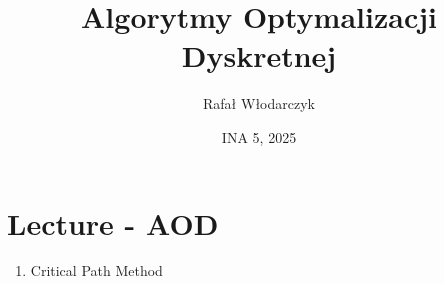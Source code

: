 \documentclass{article}
\title{Algorytmy Optymalizacji Dyskretnej}
\author{Rafał Włodarczyk}
\date{INA 5, 2025}
\numberwithin{equation}{subsection}
\begin{document}
\maketitle

\tableofcontents

\newpage

\section{Lecture - AOD}

\begin{enumerate}
\item Critical Path Method
\end{enumerate}
\end{document}
